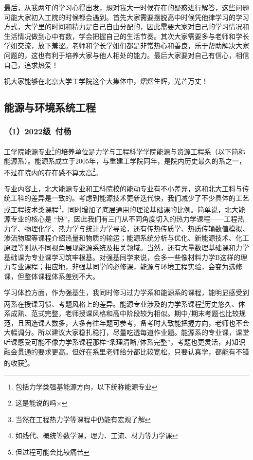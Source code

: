 最后，从我两年的学习心得出发，想对我大一时候存在的疑惑进行解答，这些问题可能大家初入工院的时候都会遇到。首先大家需要摆脱高中时候凭他律学习的学习方式，大学里的时间和精力是自己自由分配的，因此需要大家对自己的学习情况和生活情况做到心中有数，学会把握自己的生活节奏。其次大家需要多与老师和学长学姐交流，放下羞涩。老师和学长学姐们都是非常热心和善良，乐于帮助解决大家问题的，这也有利于培养大家与他人相处的能力。最后大家要对自己有信心，相信自己，追求热爱！

\vspace{10pt}

祝大家能够在北京大学工学院这个大集体中，熠熠生辉，光芒万丈！

\subsection{能源与环境系统工程}
\subsubsection{（1）2022级\ 付杨}

工学院能源专业\footnote{包括力学类强基能源方向，以下统称能源专业}的培养单位是力学与工程科学学院能源与资源工程系（以下简称能源系）。能源系成立于2005年，与重建工学院同年，是院内历史最久的系之一，不过在院内的存在感不算太高\footnote{这是能说的吗×}。

专业内容上，北大能源专业和工科院校的能动专业有不小差异，这和北大工科与传统工科的差异是一致的。考虑到能源技术更新迭代快，我们减少了不少具体的工艺或工程技术类课程\footnote{当然在工程热力学等课程中仍能有宏观了解}，同时增加了底层通用的理论基础课的比例。简单说，北大能源专业的核心是 “热”，因此我们有三门从不同角度切入的热力学课程——工程热力学、物理化学、热力学与统计力学导论，还有传热传质学、热质传输数值模拟、渗流物理等课程介绍热量和物质的输运；能源系统分析与优化、新能源技术、化工原理等则从不同视角展现能源系统及相关领域。当然，还有大量数理基础课和力学基础课为专业课学习筑牢根基。对强基同学来说，会多一些像材料力学B这样的理力专业课程；相应地，非强基同学的必修课，能源与环境工程实验，会变为选修课，但整体课程体系差别不大。

\vspace{10pt}

学习体验方面，作为强基生，我同时修习过力学系和能源系的课程，能明显感受到两系在授课习惯、考题风格上的差异。能源专业涉及的力学系课程\footnote{如线代、概统等数学课，理力、工流、材力等力学课}历史悠久、体系成熟、范式完整，老师授课风格和高中阶段较为相似。期中/期末考题也比较规范，且因选课人数多，大多有往年题可参考，备考时大致能把握方向，老师也不会大幅调分。所以建议大家稳扎稳打，尽量吃透每道作业题。能源系的专业课，课堂听课感受可能不像力学系课程那样“条理清晰/体系完整”，考题也更灵活，对知识融会贯通的要求更高。但好在系里老师给分都比较宽松，只要认真学，都能有不错的收获\footnote{但过程可能会比较痛苦}。

